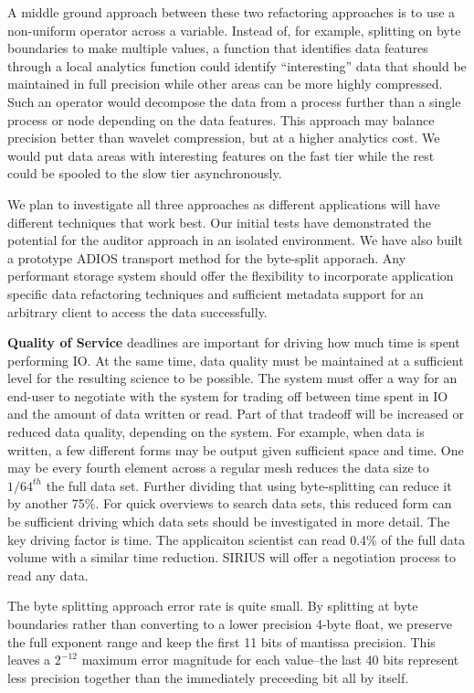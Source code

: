 \documentclass[letterpaper,twocolumn,10pt]{article}
\begin{document}
A middle ground approach between these two refactoring approaches is to use a
non-uniform operator across a variable. Instead of, for example, splitting on
byte boundaries to make multiple values, a function that identifies data
features through a local analytics function could identify ``interesting'' data
that should be maintained in full precision while other areas can be more
highly compressed. Such an operator would decompose the data from a process
further than a single process or node depending on the data features. This
approach may balance precision better than wavelet compression, but at a higher
analytics cost. We would put data areas with interesting features on the fast
tier while the rest could be spooled to the slow tier asynchronously.

We plan to investigate all three approaches as different applications will have
different techniques that work best. Our initial tests have demonstrated the
potential for the auditor approach in an isolated environment. We have also
built a prototype ADIOS transport method for the byte-split apporach. Any
performant storage system should offer the flexibility to incorporate
application specific data refactoring techniques and sufficient metadata
support for an arbitrary client to access the data successfully.

\noindent\textbf{Quality of Service} deadlines are important for driving how
much time is spent performing IO. At the same time, data quality must be
maintained at a sufficient level for the resulting science to be possible.
The system must offer a way for an end-user to negotiate with the system for
trading off between time spent in IO and the amount of data written or read.
Part of that tradeoff will be increased or reduced data quality, depending on
the system. For example, when data is written, a few different forms may be
output given sufficient space and time. One may be every fourth element
across a regular mesh reduces the data size to $1/64^{th}$ the full data set.
Further dividing that using byte-splitting can reduce it by another 75\%. For
quick overviews to search data sets, this reduced form can be sufficient
driving which data sets should be investigated in more detail. The key driving
factor is time. The applicaiton scientist can read 0.4\% of the full data
volume with a similar time reduction. SIRIUS will offer a negotiation process
to read any data.

The byte splitting approach error rate is quite small. By splitting at byte
boundaries rather than converting to a lower precision 4-byte float, we
preserve the full exponent range and keep the first 11 bits of mantissa
precision. This leaves a $2^{-12}$ maximum error magnitude for each value--the
last 40 bits represent less precision together than the immediately preceeding
bit all by itself.
\end{document}

